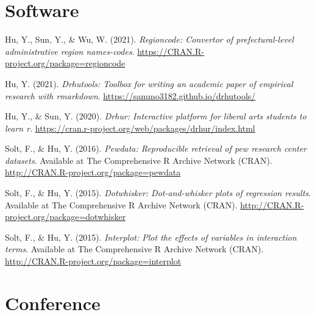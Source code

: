 \documentclass[
  12pt,
]
{article}
\newlength{\cslhangindent}
\newlength{\cslentryspacingunit} %
\newenvironment{CSLReferences}[2] %
 {%
  \setlength{\parindent}{0pt}
  \ifodd #1
  \let\oldpar\par
  \def\par{\hangindent=\cslhangindent\oldpar}
  \fi
  \setlength{\parskip}{#2\cslentryspacingunit}
 }%
 {}
\begin{document}
\hypertarget{software}{%
\section{Software}\label{software}}

\hypertarget{refs-software}{}
\begin{CSLReferences}{1}{0}
\leavevmode{}%
Hu, Y., Sun, Y., \& Wu, W. (2021). \emph{Regioncode: Convertor of
prefectural-level administrative region names-codes}.
\url{https://CRAN.R-project.org/package=regioncode}

\leavevmode{}%
Hu, Y. (2021). \emph{Drhutools: Toolbox for writing an academic paper of
empirical research with rmarkdown}.
\url{https://sammo3182.github.io/drhutools/}

\leavevmode{}%
Hu, Y., \& Sun, Y. (2020). \emph{Drhur: Interactive platform for liberal
arts students to learn r}.
\url{https://cran.r-project.org/web/packages/drhur/index.html}

\leavevmode{}%
Solt, F., \& Hu, Y. (2016). \emph{Pewdata: Reproducible retrieval of pew
research center datasets}. Available at The Comprehensive R Archive
Network (CRAN). \url{http://CRAN.R-project.org/package=pewdata}

\leavevmode{}%
Solt, F., \& Hu, Y. (2015). \emph{Dotwhisker: Dot-and-whisker plots of
regression results}. Available at The Comprehensive R Archive Network
(CRAN). \url{http://CRAN.R-project.org/package=dotwhisker}

\leavevmode{}%
Solt, F., \& Hu, Y. (2015). \emph{Interplot: Plot the effects of
variables in interaction terms}. Available at The Comprehensive R
Archive Network (CRAN).
\url{http://CRAN.R-project.org/package=interplot}

\end{CSLReferences}

\hypertarget{conference}{%
\section{Conference}\label{conference}}
\end{document}
